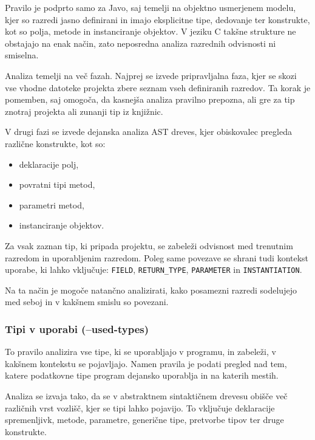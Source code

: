 \documentclass[a4paper,12pt,openright]{book}
\begin{document}
Pravilo je podprto samo za Javo, saj temelji na objektno usmerjenem modelu, kjer so razredi jasno definirani in imajo eksplicitne tipe, dedovanje ter konstrukte, kot so polja, metode in instanciranje objektov. V jeziku C takšne strukture ne obstajajo na enak način, zato neposredna analiza razrednih odvisnosti ni smiselna.

Analiza temelji na več fazah. Najprej se izvede pripravljalna faza, kjer se skozi vse vhodne datoteke projekta zbere seznam vseh definiranih razredov. Ta korak je pomemben, saj omogoča, da kasnejša analiza pravilno prepozna, ali gre za tip znotraj projekta ali zunanji tip iz knjižnic.

V drugi fazi se izvede dejanska analiza AST dreves, kjer obiskovalec pregleda različne konstrukte, kot so:
\begin{itemize}
    \item deklaracije polj,
    \item povratni tipi metod,
    \item parametri metod,
    \item instanciranje objektov.
\end{itemize}

Za vsak zaznan tip, ki pripada projektu, se zabeleži odvisnost med trenutnim razredom in uporabljenim razredom. Poleg same povezave se shrani tudi kontekst uporabe, ki lahko vključuje:
\texttt{FIELD}, \texttt{RETURN\_TYPE}, \texttt{PARAMETER} in \texttt{INSTANTIATION}.

Na ta način je mogoče natančno analizirati, kako posamezni razredi sodelujejo med seboj in v kakšnem smislu so povezani.

\subsubsection{Tipi v uporabi (--used-types)}

To pravilo analizira vse tipe, ki se uporabljajo v programu, in zabeleži, v kakšnem kontekstu se pojavljajo. Namen pravila je podati pregled nad tem, katere podatkovne tipe program dejansko uporablja in na katerih mestih.

Analiza se izvaja tako, da se v abstraktnem sintaktičnem drevesu obišče več različnih vrst vozlišč, kjer se tipi lahko pojavijo. To vključuje deklaracije spremenljivk, metode, parametre, generične tipe, pretvorbe tipov ter druge konstrukte.
\end{document}
